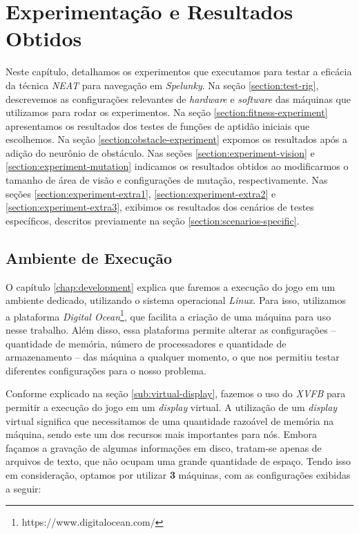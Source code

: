 \chapter{\label{chap:experimentation-and-results}Experimentação e Resultados Obtidos}

Neste capítulo, detalhamos os experimentos que executamos para testar a eficácia
da técnica \textit{NEAT} para navegação em \textit{Spelunky}. Na seção
\ref{section:test-rig}, descrevemos as configurações relevantes de
\textit{hardware} e \textit{software} das máquinas que utilizamos para rodar os
experimentos. Na seção \ref{section:fitness-experiment} apresentamos os
resultados dos testes de funções de aptidão iniciais que escolhemos. Na seção
\ref{section:obstacle-experiment} expomos os resultados após a adição do
neurônio de obstáculo. Nas seções \ref{section:experiment-vision} e
\ref{section:experiment-mutation} indicamos os resultados obtidos ao
modificarmos o tamanho de área de visão e configurações de mutação,
respectivamente. Nas seções \ref{section:experiment-extra1},
\ref{section:experiment-extra2} e \ref{section:experiment-extra3}, exibimos os
resultados dos cenários de testes específicos, descritos previamente na seção
\ref{section:scenarios-specific}.

\section{\label{section:test-rig}Ambiente de Execução}
O capítulo \ref{chap:development} explica que faremos a execução do jogo em um
ambiente dedicado, utilizando o sistema operacional \textit{Linux}. Para isso,
utilizamos a plataforma \textit{Digital
Ocean}\footnote{https://www.digitalocean.com/}, que facilita a criação de uma
máquina para uso nesse trabalho. Além disso, essa plataforma permite alterar as
configurações -- quantidade de memória, número de processadores e quantidade de
armazenamento -- das máquina a qualquer momento, o que nos permitiu testar
diferentes configurações para o nosso problema.

Conforme explicado na seção \ref{sub:virtual-display}, fazemos o uso do
\textit{XVFB} para permitir a execução do jogo em um \textit{display} virtual. A
utilização de um \textit{display} virtual significa que necessitamos de uma
quantidade razoável de memória na máquina, sendo este um dos recursos mais
importantes para nós. Embora façamos a gravação de algumas informações em disco,
tratam-se apenas de arquivos de texto, que não ocupam uma grande quantidade de
espaço. Tendo isso em consideração, optamos por utilizar \textbf{3} máquinas,
com as configurações exibidas a seguir:

